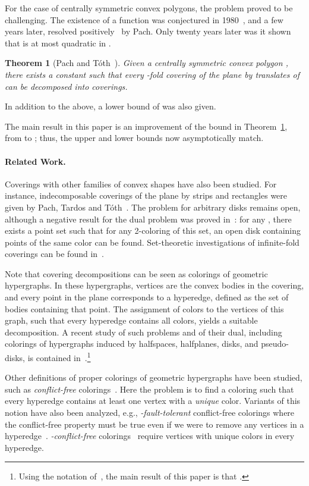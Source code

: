 \documentclass[english,11pt]{article}
\newtheorem{theorem}{Theorem}
\begin{document}
For the case of centrally symmetric convex polygons, the problem proved to be challenging. The existence of a function 
was conjectured in 1980~\cite{Pa80}, and a few years later, resolved positively~\cite{Pach86} by Pach. Only twenty years later was it shown that  is at most quadratic in .

\begin{theorem}[Pach and T\'{o}th~\cite{PT07}]
\label{we-beat-pach}
Given a centrally symmetric convex polygon , there exists a constant  such that every -fold covering of the plane by translates of  can be decomposed into  coverings.
\end{theorem}

\noindent  In addition to the above, a lower bound of   was also given.\medskip

The main result  in this paper is an improvement of the bound in Theorem~\ref{we-beat-pach}, from  to ; thus, the upper and lower bounds now asymptotically match.

\paragraph{Related Work.} 
Coverings with other families of convex shapes have also been studied. For instance, indecomposable coverings of the plane by strips and rectangles were given by Pach, Tardos and T\'{o}th~\cite{PTT07}. The problem for arbitrary disks remains open, although a negative result for the dual problem was proved in~\cite{PTT07}: for any , there exists a point set such that for any 2-coloring of this set, an open disk containing  points of the same color can be found. Set-theoretic investigations of infinite-fold coverings can be found in~\cite{settheo}.

Note that covering decompositions can be seen as colorings of geometric hypergraphs. In these hypergraphs, vertices are the convex bodies in the covering, and every point in the plane corresponds to a hyperedge, defined as the set of bodies containing that point.
The assignment of colors to the vertices of this graph, such that every hyperedge contains all  colors, yields a suitable decomposition.
A recent study of such problems and of their dual, including colorings of hypergraphs induced by halfspaces, halfplanes,  disks, and pseudo-disks, is contained in~\cite{ACCLS08}.\footnote{Using the notation of~\cite{ACCLS08}, the main result of this paper is that .}\medskip

Other definitions of proper colorings of geometric hypergraphs have been studied, such as \emph{conflict-free} colorings~\cite{shakharcf}. 
Here the problem is to find a coloring such that every hyperedge contains at least one vertex with a \emph{unique} color.
Variants of this notion have also been analyzed, e.g., \emph{-fault-tolerant} conflict-free colorings where the conflict-free property must be true even if we were to remove any  vertices in a hyperedge~\cite{faulttolerant}. \emph{-conflict-free} colorings~\cite{jithamilton} require  vertices with unique colors in every hyperedge. 
\end{document}

